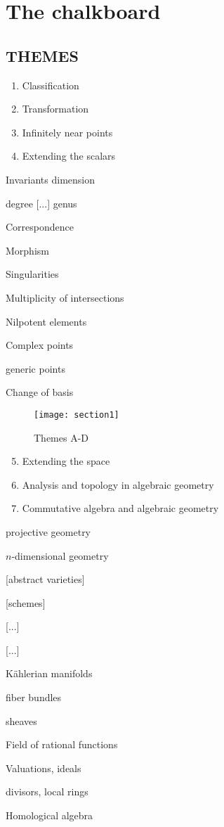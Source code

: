 \documentclass{article}
\begin{document}
\section{The chalkboard}
\subsection{THEMES}

\begin{multicols}{2}
\begin{enumerate}[label=\Alph*)]
\item Classification
\item Transformation
\item Infinitely near points
\item Extending the scalars
\end{enumerate}
\columnbreak

Invariants dimension

degree [...] genus

Correspondence

Morphism

Singularities

Multiplicity of intersections

Nilpotent elements

Complex points

generic points

Change of basis



\end{multicols}

\begin{figure}[ht]
\caption{Themes A-D}
\centering
\texttt{[image: section1]}
\end{figure}

\begin{multicols}{2}
\begin{enumerate}[label=\Alph*)]
\setcounter{enumi}{4}
\item Extending the space
\item Analysis and topology in algebraic geometry
\item Commutative algebra and algebraic geometry
\end{enumerate}
\columnbreak

projective geometry

$n$-dimensional geometry

[abstract varieties]

[schemes]

[...]

[...]

K\"ahlerian manifolds

fiber bundles

sheaves


Field of rational functions

Valuations, ideals 

divisors, local rings 

Homological algebra
\end{multicols}
\end{document}
